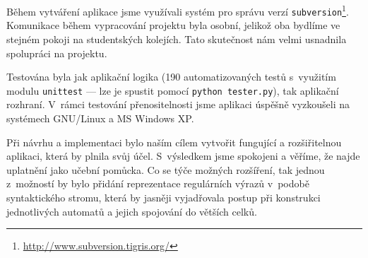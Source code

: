 \documentclass[10pt, notitlepage]{article}
\begin{document}
Během vytváření aplikace jsme využívali systém pro správu verzí
\texttt{subversion}\footnote{\url{http://www.subversion.tigris.org/}}.
Komunikace během vypracování projektu byla osobní, jelikož oba bydlíme ve
stejném pokoji na studentských kolejích. Tato skutečnost nám velmi usnadnila
spolupráci na projektu.

Testována byla jak aplikační logika (190 automatizovaných testů s~využitím
modulu \texttt{unittest} --- lze je spustit pomocí \texttt{python tester.py}),
tak aplikační rozhraní. V~rámci testování přenositelnosti jsme aplikaci úspěšně
vyzkoušeli na systémech GNU/Linux a MS Windows XP.

Při návrhu a implementaci bylo naším cílem vytvořit fungující a rozšiřitelnou
aplikaci, která by plnila svůj účel. S~výsledkem jsme spokojeni a věříme, že
najde uplatnění jako učební pomůcka.
Co se týče možných rozšíření, tak jednou z~možností by bylo přidání
reprezentace regulárních výrazů v~podobě syntaktického stromu, která by jasněji
vyjadřovala postup při konstrukci jednotlivých automatů a jejich spojování do
větších celků.
\end{document}
